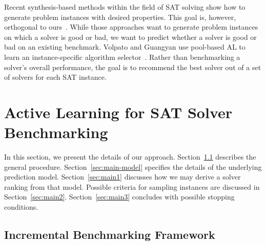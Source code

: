 \documentclass[runningheads]{llncs}
\begin{document}
Recent synthesis-based methods within the field of SAT solving show how to generate problem instances with desired properties.
This goal is, however, orthogonal to ours~\cite{0001AEMN22,GarzonMG22}.
While those approaches want to generate problem instances on which a solver is good or bad, we want to predict whether a solver is good or bad on an existing benchmark.
Volpato and Guangyan use pool-based AL to learn an instance-specific algorithm selector~\cite{volpato2019active}.
Rather than benchmarking a solver's overall performance, the goal is to recommend the best solver out of a set of solvers for each SAT instance.


\section{Active Learning for SAT Solver Benchmarking}
\label{sec:main}

In this section, we present the details of our approach.
Section~\ref{sec:main-framework} describes the general procedure.
Section~\ref{sec:main-model} specifies the details of the underlying prediction model.
Section~\ref{sec:main1} discusses how we may derive a solver ranking from that model.
Possible criteria for sampling instances are discussed in Section~\ref{sec:main2}.
Section~\ref{sec:main3} concludes with possible stopping conditions.


\subsection{Incremental Benchmarking Framework}
\label{sec:main-framework}
\end{document}
